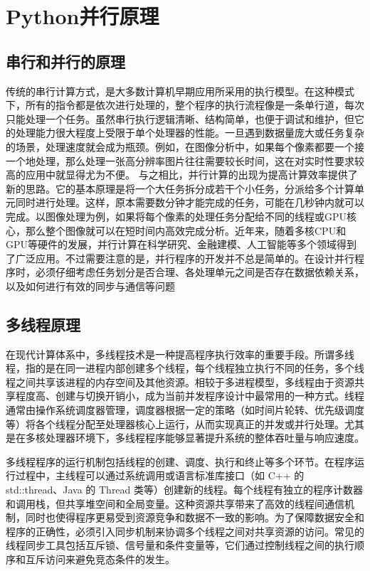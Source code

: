 \section{Python并行原理}
\subsection{串行和并行的原理}
传统的串行计算方式，是大多数计算机早期应用所采用的执行模型。在这种模式下，所有的指令都是依次进行处理的，整个程序的执行流程像是一条单行道，每次只能处理一个任务。虽然串行执行逻辑清晰、结构简单，也便于调试和维护，但它的处理能力很大程度上受限于单个处理器的性能。一旦遇到数据量庞大或任务复杂的场景，处理速度就会成为瓶颈。例如，在图像分析中，如果每个像素都要一个接一个地处理，那么处理一张高分辨率图片往往需要较长时间，这在对实时性要求较高的应用中就显得尤为不便。
与之相比，并行计算的出现为提高计算效率提供了新的思路。它的基本原理是将一个大任务拆分成若干个小任务，分派给多个计算单元同时进行处理。这样，原本需要数分钟才能完成的任务，可能在几秒钟内就可以完成。以图像处理为例，如果将每个像素的处理任务分配给不同的线程或GPU核心，那么整个图像就可以在短时间内高效完成分析。近年来，随着多核CPU和GPU等硬件的发展，并行计算在科学研究、金融建模、人工智能等多个领域得到了广泛应用。不过需要注意的是，并行程序的开发并不总是简单的。在设计并行程序时，必须仔细考虑任务划分是否合理、各处理单元之间是否存在数据依赖关系，以及如何进行有效的同步与通信等问题\cite{ref6}
\subsection{多线程原理}
在现代计算体系中，多线程技术是一种提高程序执行效率的重要手段。所谓多线程，指的是在同一进程内部创建多个线程，每个线程独立执行不同的任务，多个线程之间共享该进程的内存空间及其他资源。相较于多进程模型，多线程由于资源共享程度高、创建与切换开销小，成为当前并发程序设计中最常用的一种方式。线程通常由操作系统调度器管理，调度器根据一定的策略（如时间片轮转、优先级调度等）将各个线程分配至处理器核心上运行，从而实现真正的并发或并行处理。尤其是在多核处理器环境下，多线程程序能够显著提升系统的整体吞吐量与响应速度。

多线程程序的运行机制包括线程的创建、调度、执行和终止等多个环节。在程序运行过程中，主线程可以通过系统调用或语言标准库接口（如 C++ 的 std::thread、Java 的 Thread 类等）创建新的线程。每个线程有独立的程序计数器和调用栈，但共享堆空间和全局变量。这种资源共享带来了高效的线程间通信机制，同时也使得程序更易受到资源竞争和数据不一致的影响。为了保障数据安全和程序的正确性，必须引入同步机制来协调多个线程之间对共享资源的访问。常见的线程同步工具包括互斥锁、信号量和条件变量等，它们通过控制线程之间的执行顺序和互斥访问来避免竞态条件的发生。

